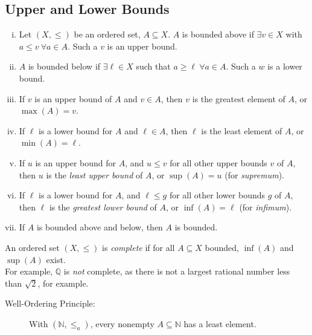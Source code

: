 \documentclass[10pt]{extarticle}
\newcommand{\N}{\mathbb{N}}
\newcommand{\Q}{\mathbb{Q}}
\begin{document}
      \subsection{Upper and Lower Bounds}%
        \begin{enumerate}[(i)]
          \item Let $(X,\leq)$ be an ordered set, $A\subseteq X$. $A$ is bounded above if $\exists v\in X$ with $a\leq v~\forall a\in A$. Such a $v$ is an upper bound.
          \item $A$ is bounded below if $\exists \ell\in X$ such that $a\geq \ell~\forall a\in A$. Such a $w$ is a lower bound.
          \item If $v$ is an upper bound of $A$ and $v\in A$, then $v$ is the greatest element of $A$, or $\max(A) = v$.
          \item If $\ell$ is a lower bound for $A$ and $\ell\in A$, then $\ell$ is the least element of $A$, or $\min(A) = \ell$.
          \item If $u$ is an upper bound for $A$, and $u \leq v$ for all other upper bounds $v$ of $A$, then $u$ is the \textsl{least upper bound} of $A$, or $\sup(A) = u$ (for \textit{supremum}).
          \item If $\ell$ is a lower bound for $A$, and $\ell \leq g$ for all other lower bounds $g$ of $A$, then $\ell$ is the \textsl{greatest lower bound} of $A$, or $\inf(A) = \ell$ (for \textit{infimum}).
          \item If $A$ is bounded above and below, then $A$ is bounded.
        \end{enumerate}
        An ordered set $(X,\leq)$ is \textsl{complete} if for all $A\subseteq X$ bounded, $\inf(A)$ and $\sup(A)$ exist.\\

        For example, $\Q$ is \textsl{not} complete, as there is not a largest rational number less than $\sqrt{2}$, for example.
        \begin{description}
          \item[Well-Ordering Principle:] With $(\N,\leq_a)$, every nonempty $A\subseteq \N$ has a least element.
        \end{description}
\end{document}
